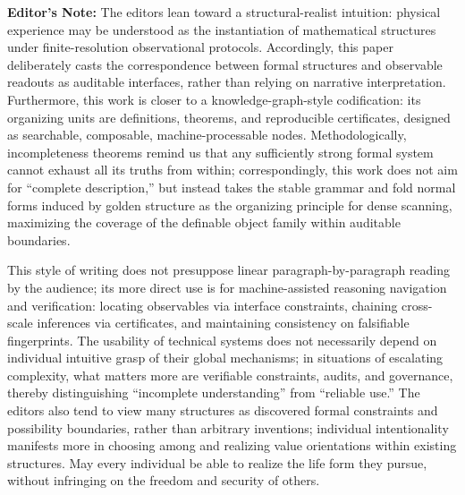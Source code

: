 \begin{sloppypar}
\textbf{Editor's Note:} The editors lean toward a structural-realist intuition: physical experience may be understood as the instantiation of mathematical structures under finite-resolution observational protocols. Accordingly, this paper deliberately casts the correspondence between formal structures and observable readouts as auditable interfaces, rather than relying on narrative interpretation. Furthermore, this work is closer to a knowledge-graph-style codification: its organizing units are definitions, theorems, and reproducible certificates, designed as searchable, composable, machine-processable nodes. Methodologically, incompleteness theorems remind us that any sufficiently strong formal system cannot exhaust all its truths from within; correspondingly, this work does not aim for ``complete description,'' but instead takes the stable grammar and fold normal forms induced by golden structure as the organizing principle for dense scanning, maximizing the coverage of the definable object family within auditable boundaries.
\par
This style of writing does not presuppose linear paragraph-by-paragraph reading by the audience; its more direct use is for machine-assisted reasoning navigation and verification: locating observables via interface constraints, chaining cross-scale inferences via certificates, and maintaining consistency on falsifiable fingerprints. The usability of technical systems does not necessarily depend on individual intuitive grasp of their global mechanisms; in situations of escalating complexity, what matters more are verifiable constraints, audits, and governance, thereby distinguishing ``incomplete understanding'' from ``reliable use.'' The editors also tend to view many structures as discovered formal constraints and possibility boundaries, rather than arbitrary inventions; individual intentionality manifests more in choosing among and realizing value orientations within existing structures. May every individual be able to realize the life form they pursue, without infringing on the freedom and security of others.
\end{sloppypar}
